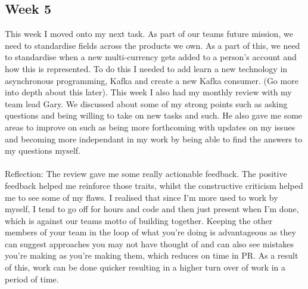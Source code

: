 \documentclass[12pt]{article} %
\begin{document}
\subsection{Week 5}
This week I moved onto my next task. As part of our teams future mission, we need to standardise fields across the products we own. As a part of this, we need to standardise when a new multi-currency gets added to a person's account and how this is represented. To do this I needed to add learn a new technology in asynchronous programming, Kafka and create a new Kafka consumer. (Go more into depth about this later). This week I also had my monthly review with my team lead Gary. We discussed about some of my strong points such as asking questions and being willing to take on new tasks and such. He also gave me some areas to improve on such as being more forthcoming with updates on my issues and becoming more independant in my work by being able to find the answers to my questions myself.
\\\\
Reflection: The review gave me some really actionable feedback. The positive feedback helped me reinforce those traits, whilst the constructive criticism helped me to see some of my flaws. I realised that since I'm more used to work by myself, I tend to go off for hours and code and then just present when I'm done, which is against our teams motto of building together. Keeping the other members of your team in the loop of what you're doing is advantageous as they can suggest approaches you may not have thought of and can also see mistakes you're making as you're making them, which reduces on time in PR. As a result of this, work can be done quicker resulting in a higher turn over of work in a period of time.
\end{document}
